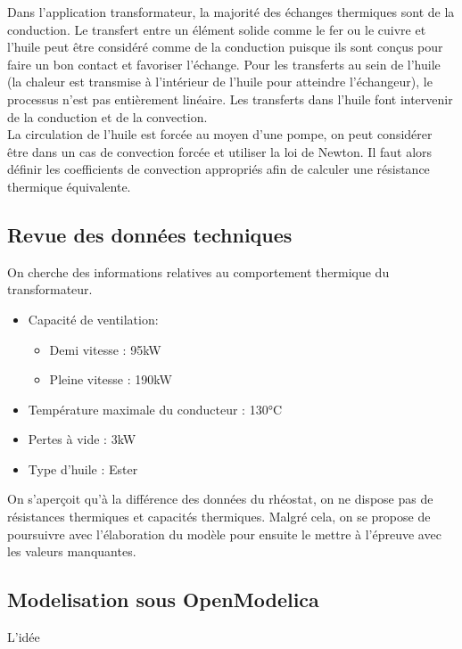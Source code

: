 \documentclass[a4paper]{report}
\begin{document}
	
	Dans l'application transformateur, la majorité des échanges thermiques sont de la conduction. Le transfert entre un élément solide comme le fer ou le cuivre et l'huile peut être considéré comme de la conduction puisque ils sont conçus pour faire un bon contact et favoriser l'échange. Pour les transferts au sein de l'huile (la chaleur est transmise à l'intérieur de l'huile pour atteindre l'échangeur), le processus n'est pas entièrement linéaire. Les transferts dans l'huile font intervenir de la conduction et de la convection.\\
	La circulation de l'huile est forcée au moyen d'une pompe, on peut considérer être dans un cas de convection forcée et utiliser la loi de Newton. Il faut alors définir les coefficients de convection appropriés afin de calculer une résistance thermique équivalente.\\
	
	\subsection{Revue des données techniques}
	
	On cherche des informations relatives au comportement thermique du transformateur.
	\begin{itemize}
		\item Capacité de ventilation:
		\begin{itemize}
			\item Demi vitesse : 95kW
			\item Pleine vitesse : 190kW
		\end{itemize}
		\item Température maximale du conducteur : 130°C
		\item Pertes à vide : 3kW
		\item Type d'huile : Ester 
	\end{itemize}
	On s'aperçoit qu'à la différence des données du rhéostat, on ne dispose pas de résistances thermiques et capacités thermiques. Malgré cela, on se propose de poursuivre avec l'élaboration du modèle pour ensuite le mettre à l'épreuve avec les valeurs manquantes.\\
	
	\subsection{Modelisation sous OpenModelica}
	
	L'idée 
	
\end{document}
